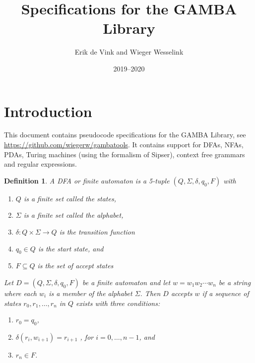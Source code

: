 \documentclass[11pt]{article}
\title{Specifications for the GAMBA Library}
\author{Erik de Vink and Wieger Wesselink}
\date{2019--2020}
\newtheorem{definition}{Definition}
\begin{document}
\maketitle

\section{Introduction}
This document contains pseudocode specifications for the GAMBA Library, see \url{https://github.com/wiegerw/gambatools}. It contains support for DFAs, NFAs, PDAs, Turing machines (using the formalism of Sipser), context free grammars and regular expressions.

\begin{definition}
A DFA or finite automaton is a 5-tuple $(Q, \Sigma, \delta, q_0, F)$ with
\begin{enumerate}
    \item $Q$ is a finite set called the states,
    \item $\Sigma$ is a finite set called the alphabet,
    \item $\delta: Q \times \Sigma \rightarrow Q$ is the transition function
    \item $q_0 \in Q$ is the start state, and
    \item $F \subseteq Q$ is the set of accept states
\end{enumerate}
Let $D = (Q, \Sigma, \delta, q_0, F)$ be a finite automaton and let $w = w_1 w_2 \cdots w_n$ be a string where each $w_i$ is a member of the alphabet $\Sigma$. Then $D$ accepts $w$ if a
sequence of states $r_0, r_1, \ldots, r_n$ in $Q$ exists with three conditions:
\begin{enumerate}
    \item $r_0 = q_0$,
    \item $\delta(r_i, w_{i+1}) = r_{i+1}$ , for $i = 0, \ldots, n - 1$, and
    \item $r_n \in F$.
\end{enumerate}
\end{definition}
\end{document}
